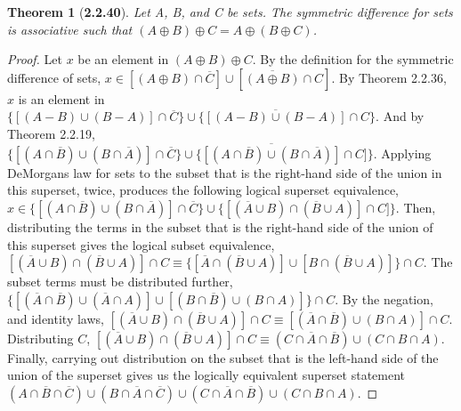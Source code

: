 \documentclass[a4paper, 12pt]{article}
\theoremstyle{plain}
\newtheorem*{theorem*}{Theorem}
\begin{document}
\pagebreak


\begin{theorem*}[\textbf{2.2.40}]
    Let A, B, and C be sets. The symmetric difference for sets is associative such that 
    $(A \oplus B) \oplus C = A \oplus (B \oplus C)$.
\end{theorem*}

\begin{proof}
    Let $x$ be an element in $(A \oplus B) \oplus C$. By the definition for the symmetric 
    difference of sets,
    $x \in [(A \oplus B) \cap \overline{C}] \cup [\overline{(A \oplus B)} \cap C]$. 
    By Theorem 2.2.36, $x$ is an element in 
    $\{[(A - B) \cup (B - A)] \cap \overline{C}\} \cup 
    \{\overline{[(A - B) \cup (B - A)]} \cap C\}$. 
    And by Theorem 2.2.19,
    $\{[(A \cap \overline{B}) \cup (B \cap \overline{A})] \cap \overline{C}\} \cup 
    \{\overline{[(A \cap \overline{B}) \cup (B \cap \overline{A})]} \cap C]\}$. 
    Applying DeMorgans law for sets to the subset that is the right-hand side of the union 
    in this superset, twice, produces the following logical superset equivalence,
    $x \in \{[(A \cap \overline{B}) \cup (B \cap \overline{A})] \cap \overline{C}\} \cup 
    \{[(\overline{A} \cup B) \cap (\overline{B} \cup A)] \cap C]\}$.
    Then, distributing the terms in the subset that is the right-hand side of the union of 
    this superset gives the logical subset equivalence,
    $[(\overline{A} \cup B) \cap (\overline{B} \cup A)] \cap C \equiv 
    \{[\overline{A} \cap (\overline{B} \cup A)] \cup [B \cap (\overline{B} \cup A)]\} \cap C$. 
    The subset terms must be distributed further,
    $\{[(\overline{A} \cap \overline{B}) \cup (\overline{A} \cap A)] \cup 
    [(B \cap \overline{B}) \cup (B \cap A)]\} \cap C$.
    By the negation, and identity laws,
    $[(\overline{A} \cup B) \cap (\overline{B} \cup A)] \cap C \equiv 
    [(\overline{A} \cap \overline{B}) \cup (B \cap A)] \cap C$. Distributing $C$, 
    $[(\overline{A} \cup B) \cap (\overline{B} \cup A)] \cap C \equiv 
    (C \cap \overline{A} \cap \overline{B}) \cup (C \cap B \cap A)$.
    Finally, carrying out distribution on the subset that is the left-hand side of the union 
    of the superset gives us the logically equivalent superset statement \newline
    $(A \cap \overline{B} \cap \overline{C}) \cup (B \cap \overline{A} \cap \overline{C}) \cup 
    (C \cap \overline{A} \cap \overline{B}) \cup (C \cap B \cap A)$.
    

\end{proof}
\end{document}
